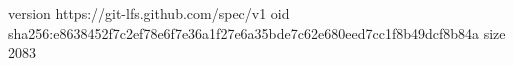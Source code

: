 version https://git-lfs.github.com/spec/v1
oid sha256:e8638452f7c2ef78e6f7e36a1f27e6a35bde7c62e680eed7cc1f8b49dcf8b84a
size 2083
